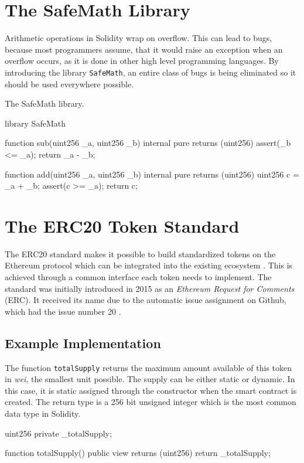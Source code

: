 \section{The SafeMath Library}
Arithmetic operations in Solidity wrap on overflow. This can lead to bugs, because most programmers assume, that it would raise an exception when an overflow occurs, as it is done in other high level programming languages. By introducing the library \texttt{SafeMath}, an entire class of bugs is being eliminated so it should be used everywhere possible.

\begin{program}
\caption{The SafeMath library.}
\label{prog:SafeMath}
\begin{GenericCode}
library SafeMath {
  function sub(uint256 _a, uint256 _b) internal pure returns (uint256) {
    assert(_b <= _a);
    return _a - _b;
  }

  function add(uint256 _a, uint256 _b) internal pure returns (uint256) {
    uint256 c = _a + _b;
    assert(c >= _a);
    return c;
  }
}
\end{GenericCode}
\end{program}

\section{The ERC20 Token Standard}
\label{sec:ERC20}
The ERC20 standard makes it possible to build standardized tokens on the Ethereum protocol which can be integrated into the existing ecosystem \cite{ERC20}. This is achieved through a common interface each token needs to implement. The standard was initially introduced in 2015 as an \textit{Ethereum Request for Comments} (ERC). It received its name due to the automatic issue assignment on Github, which had the issue number 20 \cite{AntonopoulosWood2018, BadrHorrocksWu2018}.

\subsection{Example Implementation}
The function \texttt{totalSupply} returns the maximum amount available of this token in \textit{wei}, the smallest unit possible. The supply can be either static or dynamic. In this case, it is static assigned through the constructor when the smart contract is created. The return type is a 256 bit unsigned integer which is the most common data type in Solidity.

\begin{GenericCode}
 uint256 private _totalSupply;
  
 function totalSupply() public view returns (uint256) {
   return _totalSupply;
 }	
\end{GenericCode}

